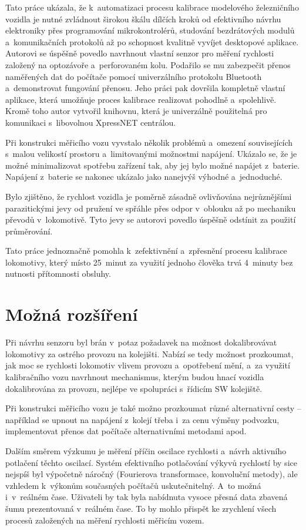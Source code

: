 Tato práce ukázala, že k~automatizaci procesu kalibrace modelového železničního
vozidla je nutné zvládnout širokou škálu dílčích kroků od efektivního návrhu
elektroniky přes programování mikrokontrolérů, studování bezdrátových modulů
a~komunikačních protokolů až po schopnost kvalitně vyvíjet desktopové aplikace.
Autorovi se úspěšně povedlo navrhnout vlastní senzor pro měření rychlosti
založený na optozávoře a~perforovaném kolu. Podařilo se mu zabezpečit přenos
naměřených dat do počítače pomocí univerzálního protokolu Bluetooth
a~demonstrovat fungování přenosu. Jeho práci pak dovršila kompletně vlastní
aplikace, která umožňuje proces kalibrace realizovat pohodlně a~spolehlivě.
Kromě toho autor vytvořil knihovnu, která je univerzálně použitelná pro
komunikaci s~libovolnou XpressNET centrálou.

Při konstrukci měřicího vozu vyvstalo několik problémů a~omezení souvisejících
s~malou velikostí prostoru a~limitovanými možnostmi napájení. Ukázalo se, že je
možné minimalizovat spotřebu zařízení tak, aby jej bylo možné napájet
z~baterie.  Napájení z~baterie se nakonec ukázalo jako nanejvýš výhodné
a~jednoduché.

Bylo zjištěno, že rychlost vozidla je poměrně zásadně ovlivňována nejrůznějšími
parazitickými jevy od pružení ve spřáhle přes odpor v~oblouku až po mechaniku
převodů v~lokomotivě. Tyto jevy se autorovi povedlo úspěšně odstínit za použití
průměrování.

Tato práce jednoznačně pomohla k~zefektivnění a~zpřesnění procesu kalibrace
lokomotivy, který místo 25~minut za využití jednoho člověka trvá 4~minuty
bez nutnosti přítomnosti obsluhy.

\section{Možná rozšíření}

Při návrhu senzoru byl brán v~potaz požadavek na možnost dokalibrovávat
lokomotivy za ostrého provozu na kolejišti. Nabízí se tedy možnost prozkoumat,
jak moc se rychlosti lokomotiv vlivem provozu a~opotřebení mění, a~za využití
kalibračního vozu navrhnout mechanismus, kterým budou hnací vozidla
dokalibrována za provozu, nejlépe ve spolupráci s~řídicím SW kolejiště.

Při konstrukci měřicího vozu je také možno prozkoumat různé alternativní
cesty -- například se upnout na napájení z~kolejí třeba i~za cenu výměny
podvozku, implementovat přenos dat počítače alternativními metodami apod.

Dalším směrem výzkumu je měření příčin oscilace rychlosti a~návrh
aktivního potlačení těchto oscilací. Systém efektivního potlačování výkyvů
rychlostí by sice nejspíš byl výpočetně náročný (Fourierova transformace,
konvoluční metody), ale vzhledem k~výkonům současných počítačů uskutečnitelný.
A~to možná i~v~reálném čase. Uživateli by tak byla nabídnuta vysoce přesná data
zbavená šumu prezentovaná v~reálném čase. To by mohlo přispět ke zrychlení
všech procesů založených na měření rychlosti měřicím vozem.
